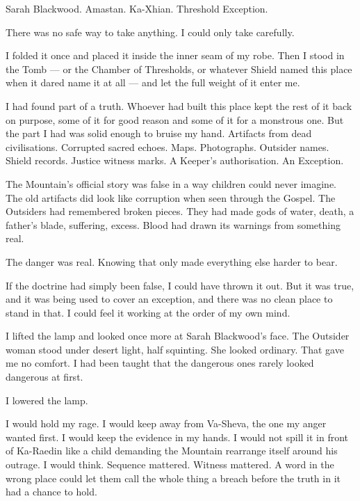 Sarah Blackwood. Amastan. Ka-Xhian. Threshold Exception.\par

There was no safe way to take anything. I could only take carefully.\par

I folded it once and placed it inside the inner seam of my robe. Then I stood in the Tomb --- or the Chamber of Thresholds, or whatever Shield named this place when it dared name it at all --- and let the full weight of it enter me.\par

I had found part of a truth. Whoever had built this place kept the rest of it back on purpose, some of it for good reason and some of it for a monstrous one. But the part I had was solid enough to bruise my hand. Artifacts from dead civilisations. Corrupted sacred echoes. Maps. Photographs. Outsider names. Shield records. Justice witness marks. A Keeper's authorisation. An Exception.\par

The Mountain's official story was false in a way children could never imagine. The old artifacts did look like corruption when seen through the Gospel. The Outsiders had remembered broken pieces. They had made gods of water, death, a father's blade, suffering, excess. Blood had drawn its warnings from something real.\par

The danger was real. Knowing that only made everything else harder to bear.\par

If the doctrine had simply been false, I could have thrown it out. But it was true, and it was being used to cover an exception, and there was no clean place to stand in that. I could feel it working at the order of my own mind.\par

I lifted the lamp and looked once more at Sarah Blackwood's face. The Outsider woman stood under desert light, half squinting. She looked ordinary. That gave me no comfort. I had been taught that the dangerous ones rarely looked dangerous at first.\par

I lowered the lamp.\par

I would hold my rage. I would keep away from Va-Sheva, the one my anger wanted first. I would keep the evidence in my hands. I would not spill it in front of Ka-Raedin like a child demanding the Mountain rearrange itself around his outrage. I would think. Sequence mattered. Witness mattered. A word in the wrong place could let them call the whole thing a breach before the truth in it had a chance to hold.\par

